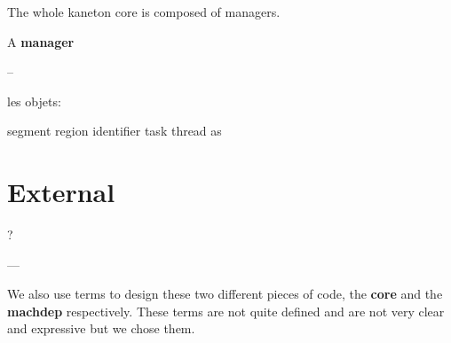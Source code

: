 The whole kaneton core is composed of managers.

A \textbf{manager}

--

les objets:

segment region identifier task thread as

%
%

\section{External}

?

---

We also use terms to design these two different pieces of code, the
\textbf{core} and the \textbf{machdep} respectively. These terms are not
quite defined and are not very clear and expressive but we chose them.
